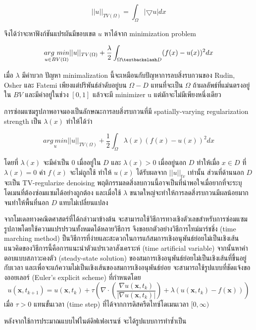 \documentclass[hidelinks,a4paper,14pt]{article}
\numberwithin{equation}{section}							%
\begin{document}
{		$$ ||u||_{TV(\Omega)} = \int_{\Omega} | \bigtriangledown u | dx$$
		
		จึงได้ว่าจะหาฟังก์ชันแปรผันมีขอบเขต $u$ หาได้จาก minimization problem
		
		$$ \underset{u \in BV(\Omega)}{arg \ min} ||u||_{TV(\Omega)} + \frac{\lambda}{2} \int_{\Omega \textbackslash D} (f(x) - u(x))^2 dx$$
		
		เมื่อ $\lambda$ มีค่าบวก ปัญหา minimalization นี้จะเหมือนกับปัญหาการลบสิ่งรบกวนของ Rudin, Osher และ Fatemi เพียงแต่ปริพันธ์ลำดับอยู่บน $\Omega-D$  แทนที่จะเป็น $\Omega$ ถ้าผลลัพธ์ที่แม่นตรงอยู่ใน $BV$ และมีค่าอยู่ในช่วง $[0,1]$ แล้วจะมี minimizer u แต่มักจะไม่มีเพียงหนึ่งเดียว 
		
		การซ่อมแซมรูปภาพอาจมองเป็นลักษณะการลบสิ่งรบกวนที่มี spatially-varying regularization strength เป็น $\lambda(x)$ ทำให้ได้ว่า
		
		$$\underset{u}{{arg \ min}} ||u||_{TV(\Omega)} + \frac{1}{2} \int_{\Omega} \lambda(x)(f(x) - u(x))^2 dx$$
		
		โดยที่ $\lambda(x)$ จะมีค่าเป็น $0$ เมื่ออยู่ใน $D$ และ $\lambda(x)>0$ เมื่ออยู่นอก $D$  ทำให้เมื่อ $x \in D$ ที่ $\lambda(x)=0$ ค่า $f(x)$ จะไม่ถูกใช้ ทำให้ $u(x)$ ได้รับผลจาก $||u||_{tv}$ เท่านั้น ส่วนที่ด้านนอก $D$ จะเป็น TV-regularize denoising พฤติกรรมลดสิ่งลบกวนนี้อาจเป็นที่น่าพอใจเมื่อยากที่จะระบุโดเมนที่ต้องซ่อมแซมได้อย่างถูกต้อง และเมื่อใช้ $λ$ ขนาดใหญ่จะทำให้การลดสิ่งรบกวนมีผลน้อยมากจนทำให้พื้นที่นอก $D$  แทบไม่เปลี่ยนแปลง
		
		จากโมเดลทางคณิตศาสตร์ที่ได้กล่าวมาข้างต้น จะสามารถใช้วิธีการทางเชิงตัวเลขสำหรับการซ่อมแซมรูปภาพโดยใช้ความแปรปรวนทั้งหมดได้หลายวิธีการ จึงขอยกตัวอย่างวิธีการไทม์มาร์ชชิ่ง (time marching method) \cite{ref:ExplicitTimeMarching}  ป็นวิธีการที่ง่ายและสะดวกในการแก้สมการเชิงอนุพันธ์ย่อยไม่เป็นเชิงเส้น
		แนวคิดของวิธีการนี้คือการแนะนําตัวแปรเวลาสังเคราะห์ (time artificial variable) จากนั้นหาคําตอบแบบสภาวะคงตัว (steady-state solution) ของสมการเชิงอนุพันธ์ย่อยไม่เป็นเชิงเส้นที่ขึ้นอยู่กับเวลา และเพื่อจะแก้ความไม่เป็นเชิงเส้นของสมการเชิงอนุพันธ์ย่อย จะสามารถใช้รูปแบบที่ชัดแจ้งของออยเลอร์ (Euler's explicit scheme) ที่กำหนดโดย
		$$
		u(\mathbf{x},t_{k+1})=u(\mathbf{x},t_{k})+\tau\left(\nabla\cdot\left(\frac{\nabla u ( \mathbf{x},t_k)}{\lvert \nabla u ( \mathbf{x},t_k) \rvert }\right) + \lambda(u ( \mathbf{x},t_k)-f(\mathbf{x})) \right)
		$$
		เมื่อ $\tau>0$ แทนขั้นเวลา (time step) ที่ได้จากการดิสครีตไทซ์โดเมนเวลา $[0,\infty)$
		
		หลังจากใช้การประมาณแบบไฟไนต์ดิฟเฟอเรนซ์ จะได้รูปแบบการทำซ้ำเป็น
		
}
\end{document}
